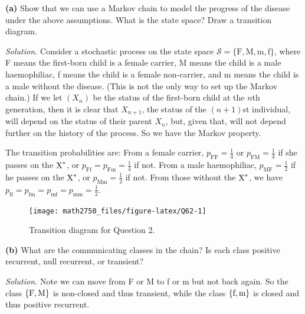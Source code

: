 \documentclass[
  a4paper,
]{article}
\theoremstyle{definition}
\theoremstyle{definition}
\theoremstyle{definition}
\theoremstyle{remark}
\begin{document}
\textbf{(a)} Show that we can use a Markov chain to model the progress of the disease under the above assumptions. What is the state space? Draw a transition diagram.

\begin{myanswers}

\emph{Solution.}
Consider a stochastic process on the state space \(\mathcal S = \{\text{F}, \text{M}, \text{m}, \text{f}\}\), where F means the first-born child is a female carrier, M means the child is a male haemophiliac, f means the child is a female non-carrier, and m means the child is a male without the disease. (This is not the only way to set up the Markov chain.) If we let \((X_n)\) be the status of the first-born child at the \(n\)th generation, then it is clear that \(X_{n+1}\), the status of the \((n+1)\)st individual, will depend on the status of their parent \(X_n\), but, given that, will not depend further on the history of the process. So we have the Markov property.

The transition probabilities are: From a female carrier, \(p_{\mathrm{FF}} = \frac14\) or \(p_{\mathrm{FM}} = \frac14\) if she passes on the \(\text X^*\), or \(p_{\mathrm{Ff}} = p_{\mathrm{Fm}} = \frac14\) if not. From a male haemophiliac, \(p_{\mathrm{MF}} = \frac12\) if he passes on the \(\text X^*\), or \(p_{\mathrm{Mm}} = \frac12\) if not. From those without the \(\text X^*\), we have \(p_{\mathrm{ff}} = p_{\mathrm{fm}} = p_{\mathrm{mf}} =p_{\mathrm{mm}} = \frac12\).

\begin{figure}

{\centering \texttt{[image: math2750\_files/figure-latex/Q62-1]} 

}

\caption{Transition diagram for Question 2.}\label{fig:Q62}
\end{figure}

\end{myanswers}

\textbf{(b)} What are the communicating classes in the chain? Is each class positive recurrent, null recurrent, or transient?

\begin{myanswers}
\emph{Solution.}
Note we can move from F or M to f or m but not back again. So the class \(\{\text F, \text M\}\) is non-closed and thus transient, while the class \(\{\text f, \text m\}\) is closed and thus positive recurrent.

\end{myanswers}
\end{document}
